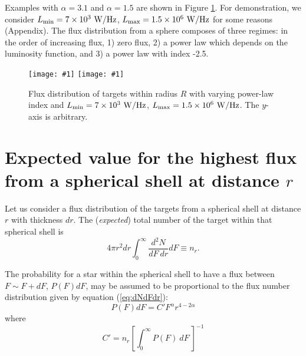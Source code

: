 \documentclass[iop,numberedappendix,apj,twocolappendix,]{emulateapj}
\def\plotoneh#1{\centering \leavevmode
\texttt{[image: \#1]}}
\begin{document}
\vspace{1\baselineskip}

Examples with $\alpha = 3.1$ and $\alpha = 1.5$ are shown in Figure \ref{fig:dndF}. For demonstration, we consider $L_{\rm min } = 7\times 10^3~{\rm W/Hz}$, $L_{\rm max} = 1.5\times 10^6~{\rm W/Hz}$ for some reasons (Appendix). 
The flux distribution from a sphere composes of three regimes: in the order of increasing flux, 1) zero flux, 2) a power law which depends on the luminosity function, and 3) a power law with index -2.5. 




\newpage


\begin{figure}[htbp]
   \plotoneh{dndF_alpha31.pdf}
   \plotoneh{dndF_alpha15.pdf}
   \caption{Flux distribution of targets within radius $R$ with varying power-law index and $L_{\rm min } = 7\times 10^3~{\rm W/Hz}$, $L_{\rm max} = 1.5\times 10^6~{\rm W/Hz}$. The $y$-axis is arbitrary. }
  \label{fig:dndF}
\end{figure}



\newpage

\section{Expected value for the highest flux from a spherical shell at distance $r$}


Let us consider a flux distribution of the targets from a spherical shell at distance $r$ with thickness $dr$. 
The ({\it expected}) total number of the target within that spherical shell is
\begin{equation}
4 \pi r^2 dr \int _0 ^{\infty} \frac{d^2 N}{dF~dr} dF \equiv n_r. 
\end{equation}

The probability for a star within the spherical shell to have a flux between $F\sim F+dF$, $P(F)dF $, may be assumed to be proportional to the flux number distribution given by equation (\ref{eq:dNdFdr}):
\begin{equation}
P(F) dF = C' F^{\alpha } r^{4-2\alpha }
\end{equation}
where
\begin{equation}
C' = n_r \left[ \int _0 ^{\infty}P(F)~dF~\right]^{-1}
\end{equation}
\end{document}
